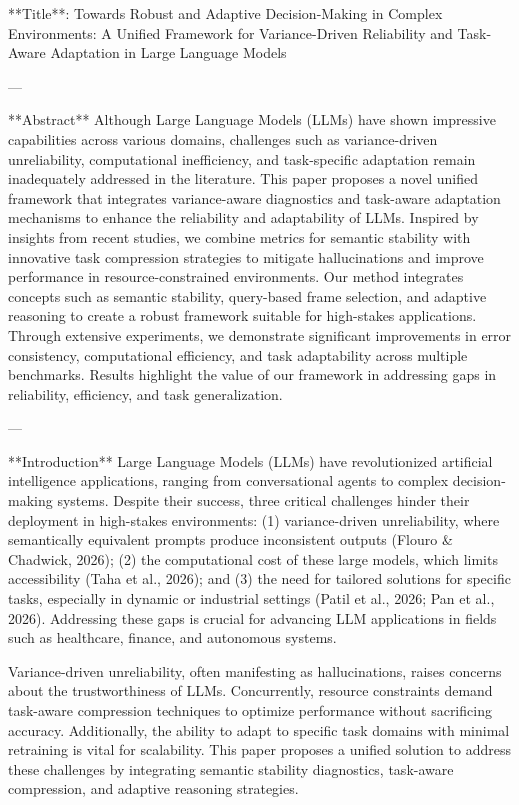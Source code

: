 **Title**: Towards Robust and Adaptive Decision-Making in Complex Environments: A Unified Framework for Variance-Driven Reliability and Task-Aware Adaptation in Large Language Models  

---

**Abstract**  
Although Large Language Models (LLMs) have shown impressive capabilities across various domains, challenges such as variance-driven unreliability, computational inefficiency, and task-specific adaptation remain inadequately addressed in the literature. This paper proposes a novel unified framework that integrates variance-aware diagnostics and task-aware adaptation mechanisms to enhance the reliability and adaptability of LLMs. Inspired by insights from recent studies, we combine metrics for semantic stability with innovative task compression strategies to mitigate hallucinations and improve performance in resource-constrained environments. Our method integrates concepts such as semantic stability, query-based frame selection, and adaptive reasoning to create a robust framework suitable for high-stakes applications. Through extensive experiments, we demonstrate significant improvements in error consistency, computational efficiency, and task adaptability across multiple benchmarks. Results highlight the value of our framework in addressing gaps in reliability, efficiency, and task generalization.

---

**Introduction**  
Large Language Models (LLMs) have revolutionized artificial intelligence applications, ranging from conversational agents to complex decision-making systems. Despite their success, three critical challenges hinder their deployment in high-stakes environments: (1) variance-driven unreliability, where semantically equivalent prompts produce inconsistent outputs (Flouro & Chadwick, 2026); (2) the computational cost of these large models, which limits accessibility (Taha et al., 2026); and (3) the need for tailored solutions for specific tasks, especially in dynamic or industrial settings (Patil et al., 2026; Pan et al., 2026). Addressing these gaps is crucial for advancing LLM applications in fields such as healthcare, finance, and autonomous systems.

Variance-driven unreliability, often manifesting as hallucinations, raises concerns about the trustworthiness of LLMs. Concurrently, resource constraints demand task-aware compression techniques to optimize performance without sacrificing accuracy. Additionally, the ability to adapt to specific task domains with minimal retraining is vital for scalability. This paper proposes a unified solution to address these challenges by integrating semantic stability diagnostics, task-aware compression, and adaptive reasoning strategies.

